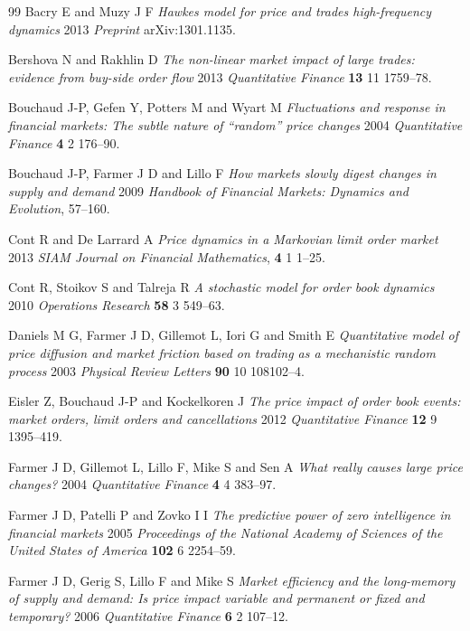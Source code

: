 \documentclass[12pt]{iopart}
\begin{document}
\begin{thebibliography}{99}
 Bacry E and Muzy J F \textit{Hawkes model for price and trades high-frequency dynamics} 2013 \textit{Preprint} arXiv:1301.1135.

 Bershova N and Rakhlin D \textit{The non-linear market impact of large trades: evidence from buy-side order flow} 2013 \textit{Quantitative Finance} \textbf{13} 11 1759--78.

 Bouchaud J-P, Gefen Y, Potters M and Wyart M \textit{Fluctuations and response in financial markets: The subtle nature of “random” price changes} 2004 \textit{Quantitative Finance} \textbf{4} 2 176--90.

 Bouchaud J-P, Farmer J D and Lillo F \textit{How markets slowly digest changes in supply and demand} 2009 \textit{Handbook of Financial Markets: Dynamics and Evolution}, 57--160.

 Cont R and De Larrard A \textit{Price dynamics in a {Markovian} limit order market} 2013 \textit{SIAM Journal on Financial Mathematics}, \textbf{4} 1 1--25.

 Cont R, Stoikov S and Talreja R \textit{A stochastic model for order book dynamics} 2010 \textit{Operations Research} \textbf{58} 3 549--63.

 Daniels M G, Farmer J D, Gillemot L, Iori G and Smith E \textit{Quantitative model of price diffusion and market friction based on trading as a mechanistic random process} 2003 \textit{Physical Review Letters} \textbf{90} 10 108102--4.

 Eisler Z, Bouchaud J-P and Kockelkoren J \textit{The price impact of order book events: market orders, limit orders and cancellations} 2012 \textit{Quantitative Finance} \textbf{12} 9 1395--419.

 Farmer J D, Gillemot L, Lillo F, Mike S and Sen A \textit{What really causes large price changes?} 2004 \textit{Quantitative Finance} \textbf{4} 4 383--97.

 Farmer J D, Patelli P and Zovko I I \textit{The predictive power of zero intelligence in financial markets} 2005 \textit{Proceedings of the National Academy of Sciences of the United States of America} \textbf{102} 6 2254--59.

 Farmer J D, Gerig S, Lillo F and Mike S \textit{Market efficiency and the long-memory of supply and demand: Is price impact variable and permanent or fixed and temporary?} 2006 \textit{Quantitative Finance} \textbf{6} 2 107--12.


\end{thebibliography}
\end{document}
